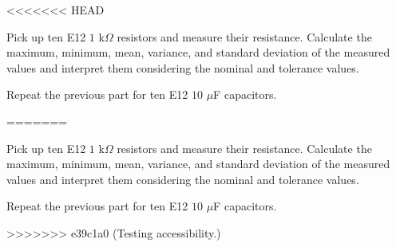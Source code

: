 \documentclass[11pt]{article}
\begin{document}
\begin{question}

<<<<<<< HEAD

\begin{subquestion}{Pick up ten E12 $1$ k$\Omega$ resistors and measure their resistance. Calculate the maximum, minimum, mean, variance, and standard deviation of the measured values and interpret them considering the nominal and tolerance values. } 
\answer{}
\end{subquestion}

\begin{subquestion}{Repeat the previous part for ten E12 $10$ $\mu$F capacitors. } 
\answer{}
\end{subquestion}
=======

    \begin{subquestion}{Pick up ten E12 $1$ k$\Omega$ resistors and measure their resistance. Calculate the maximum, minimum, mean, variance, and standard deviation of the measured values and interpret them considering the nominal and tolerance values. }
        \answer{}
    \end{subquestion}

    \begin{subquestion}{Repeat the previous part for ten E12 $10$ $\mu$F capacitors. }
        \answer{}
    \end{subquestion}
>>>>>>> e39c1a0 (Testing accessibility.)

\end{question}

\end{document}

